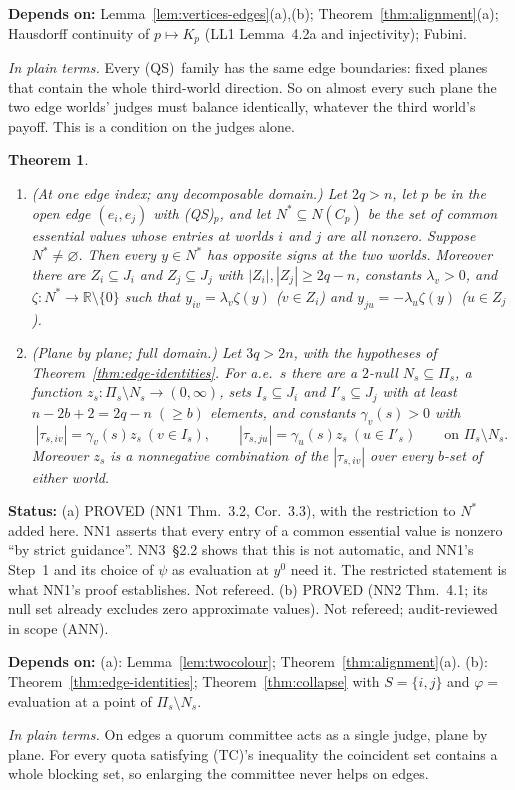\documentclass[11pt]{article}
\newtheorem{theorem}{Theorem}[section]
\theoremstyle{definition}
\theoremstyle{remark}
\newcommand{\R}{\mathbb R}
\newcommand{\src}[1]{\textsf{#1}}
\newcommand{\status}[1]{\par\smallskip\noindent\textbf{Status:} #1\par}
\newcommand{\deps}[1]{\noindent\textbf{Depends on:} #1\par}
\newcommand{\inwords}[1]{\noindent\textit{In plain terms.} #1\par\smallskip}
\newcommand{\QS}{\textup{(QS)}}
\newcommand{\TC}{\textup{(TC)}}
\begin{document}
\deps{Lemma~\ref{lem:vertices-edges}(a),(b); Theorem~\ref{thm:alignment}(a); Hausdorff continuity of $p\mapsto K_p$ (\src{LL1} Lemma~4.2a and injectivity); Fubini.}
\inwords{Every \QS\ family has the same edge boundaries: fixed planes that contain the whole third-world direction. So on almost every such plane the two edge worlds' judges must balance identically, whatever the third world's payoff. This is a condition on the judges alone.}

\begin{theorem}\label{thm:edge-collapse}
\begin{enumerate}[label=(\alph*)]
\item \emph{(At one edge index; any decomposable domain.)} Let $2q>n$, let $p$ be in the open edge $(e_i,e_j)$ with \QS$_p$, and let $N^*\subseteq N(C_p)$ be the set of common essential values whose entries at worlds $i$ and $j$ are all nonzero. Suppose $N^*\ne\varnothing$. Then every $y\in N^*$ has opposite signs at the two worlds. Moreover there are $Z_i\subseteq J_i$ and $Z_j\subseteq J_j$ with $|Z_i|,|Z_j|\ge2q-n$, constants $\lambda_v>0$, and $\zeta:N^*\to\R\setminus\{0\}$ such that $y_{iv}=\lambda_v\zeta(y)$ ($v\in Z_i$) and $y_{ju}=-\lambda_u\zeta(y)$ ($u\in Z_j$).
\item \emph{(Plane by plane; full domain.)} Let $3q>2n$, with the hypotheses of Theorem~\ref{thm:edge-identities}. For a.e.\ $s$ there are a $2$-null $N_s\subseteq\Pi_s$, a function $z_s:\Pi_s\setminus N_s\to(0,\infty)$, sets $I_s\subseteq J_i$ and $I'_s\subseteq J_j$ with at least $n-2b+2=2q-n\;(\ge b)$ elements, and constants $\gamma_v(s)>0$ with
\[
|\tau_{s,iv}|=\gamma_v(s)z_s\ (v\in I_s),\qquad|\tau_{s,ju}|=\gamma_u(s)z_s\ (u\in I'_s)\qquad\text{on }\Pi_s\setminus N_s.
\]
Moreover $z_s$ is a nonnegative combination of the $|\tau_{s,iv}|$ over every $b$-set of either world.
\end{enumerate}
\end{theorem}
\status{(a) PROVED (\src{NN1} Thm.~3.2, Cor.~3.3), with the restriction to $N^*$ added here. \src{NN1} asserts that every entry of a common essential value is nonzero ``by strict guidance''. \src{NN3}~\S2.2 shows that this is not automatic, and \src{NN1}'s Step~1 and its choice of $\psi$ as evaluation at $y^0$ need it. The restricted statement is what \src{NN1}'s proof establishes. Not refereed. (b) PROVED (\src{NN2} Thm.~4.1; its null set already excludes zero approximate values). Not refereed; audit-reviewed in scope (\src{ANN}).}
\deps{(a): Lemma~\ref{lem:twocolour}; Theorem~\ref{thm:alignment}(a). (b): Theorem~\ref{thm:edge-identities}; Theorem~\ref{thm:collapse} with $S=\{i,j\}$ and $\varphi=$ evaluation at a point of $\Pi_s\setminus N_s$.}
\inwords{On edges a quorum committee acts as a single judge, plane by plane. For every quota satisfying \TC's inequality the coincident set contains a whole blocking set, so enlarging the committee never helps on edges.}
\end{document}
